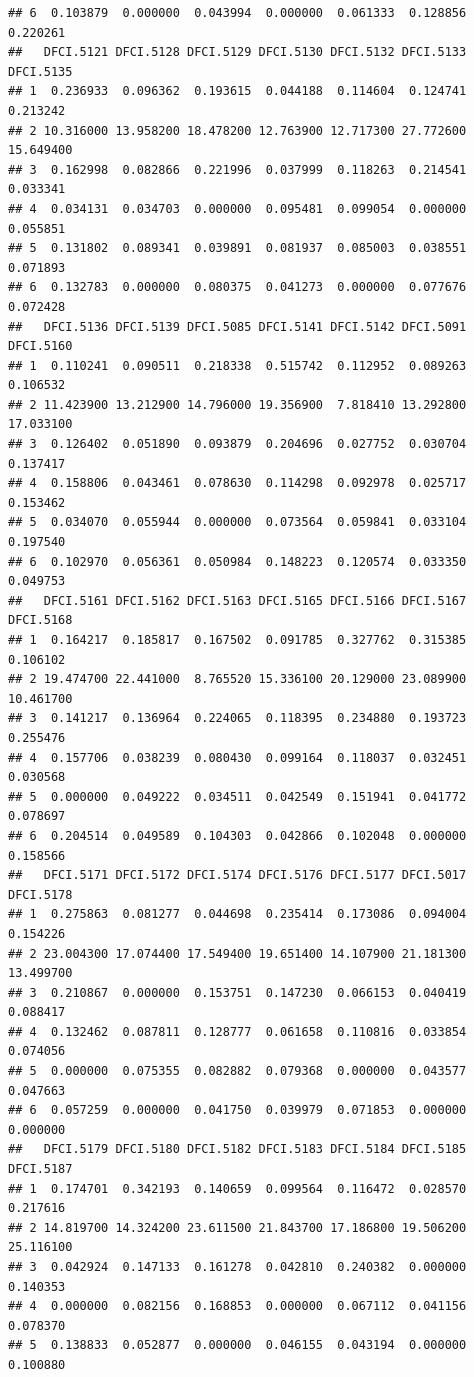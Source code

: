 \documentclass[
]{article}
\begin{document}
\begin{verbatim}
## 6  0.103879  0.000000  0.043994  0.000000  0.061333  0.128856  0.220261
##   DFCI.5121 DFCI.5128 DFCI.5129 DFCI.5130 DFCI.5132 DFCI.5133 DFCI.5135
## 1  0.236933  0.096362  0.193615  0.044188  0.114604  0.124741  0.213242
## 2 10.316000 13.958200 18.478200 12.763900 12.717300 27.772600 15.649400
## 3  0.162998  0.082866  0.221996  0.037999  0.118263  0.214541  0.033341
## 4  0.034131  0.034703  0.000000  0.095481  0.099054  0.000000  0.055851
## 5  0.131802  0.089341  0.039891  0.081937  0.085003  0.038551  0.071893
## 6  0.132783  0.000000  0.080375  0.041273  0.000000  0.077676  0.072428
##   DFCI.5136 DFCI.5139 DFCI.5085 DFCI.5141 DFCI.5142 DFCI.5091 DFCI.5160
## 1  0.110241  0.090511  0.218338  0.515742  0.112952  0.089263  0.106532
## 2 11.423900 13.212900 14.796000 19.356900  7.818410 13.292800 17.033100
## 3  0.126402  0.051890  0.093879  0.204696  0.027752  0.030704  0.137417
## 4  0.158806  0.043461  0.078630  0.114298  0.092978  0.025717  0.153462
## 5  0.034070  0.055944  0.000000  0.073564  0.059841  0.033104  0.197540
## 6  0.102970  0.056361  0.050984  0.148223  0.120574  0.033350  0.049753
##   DFCI.5161 DFCI.5162 DFCI.5163 DFCI.5165 DFCI.5166 DFCI.5167 DFCI.5168
## 1  0.164217  0.185817  0.167502  0.091785  0.327762  0.315385  0.106102
## 2 19.474700 22.441000  8.765520 15.336100 20.129000 23.089900 10.461700
## 3  0.141217  0.136964  0.224065  0.118395  0.234880  0.193723  0.255476
## 4  0.157706  0.038239  0.080430  0.099164  0.118037  0.032451  0.030568
## 5  0.000000  0.049222  0.034511  0.042549  0.151941  0.041772  0.078697
## 6  0.204514  0.049589  0.104303  0.042866  0.102048  0.000000  0.158566
##   DFCI.5171 DFCI.5172 DFCI.5174 DFCI.5176 DFCI.5177 DFCI.5017 DFCI.5178
## 1  0.275863  0.081277  0.044698  0.235414  0.173086  0.094004  0.154226
## 2 23.004300 17.074400 17.549400 19.651400 14.107900 21.181300 13.499700
## 3  0.210867  0.000000  0.153751  0.147230  0.066153  0.040419  0.088417
## 4  0.132462  0.087811  0.128777  0.061658  0.110816  0.033854  0.074056
## 5  0.000000  0.075355  0.082882  0.079368  0.000000  0.043577  0.047663
## 6  0.057259  0.000000  0.041750  0.039979  0.071853  0.000000  0.000000
##   DFCI.5179 DFCI.5180 DFCI.5182 DFCI.5183 DFCI.5184 DFCI.5185 DFCI.5187
## 1  0.174701  0.342193  0.140659  0.099564  0.116472  0.028570  0.217616
## 2 14.819700 14.324200 23.611500 21.843700 17.186800 19.506200 25.116100
## 3  0.042924  0.147133  0.161278  0.042810  0.240382  0.000000  0.140353
## 4  0.000000  0.082156  0.168853  0.000000  0.067112  0.041156  0.078370
## 5  0.138833  0.052877  0.000000  0.046155  0.043194  0.000000  0.100880

\end{verbatim}
\end{document}
